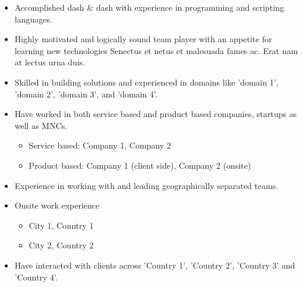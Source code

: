 \documentclass[10pt, a4paper]{sivu}
\begin{document}
\makecvheader
\medskip



\begin{itemize}
    \item Accomplished dash \& dash with experience in programming and scripting languages.
    \item Highly motivated and logically sound team player with an appetite for learning new technologies Senectus et netus et malesuada fames ac. Erat nam at lectus urna duis.
    \item Skilled in building solutions and experienced in domains like 'domain 1', 'domain 2', 'domain 3', and 'domain 4'.
\end{itemize}
\medskip




\begin{itemize}
    \item Have worked in both service based and product based companies, startups as well as MNCs.\smallskip
        \begin{itemize}[label=\dashedbullets]
            \item Service based: Company 1, Company 2
            \item Product based: Company 1 (client side), Company 2 (onsite)
        \end{itemize}
    \item Experience in working with and leading geographically separated teams.
    \item Onsite work experience\smallskip
        \begin{itemize}[label=\dashedbullets]
            \item City 1, Country 1
            \item City 2, Country 2
        \end{itemize}
    \item Have interacted with clients across 'Country 1', 'Country 2', 'Country 3' and 'Country 4'.
\end{itemize}

\medskip
\end{document}
